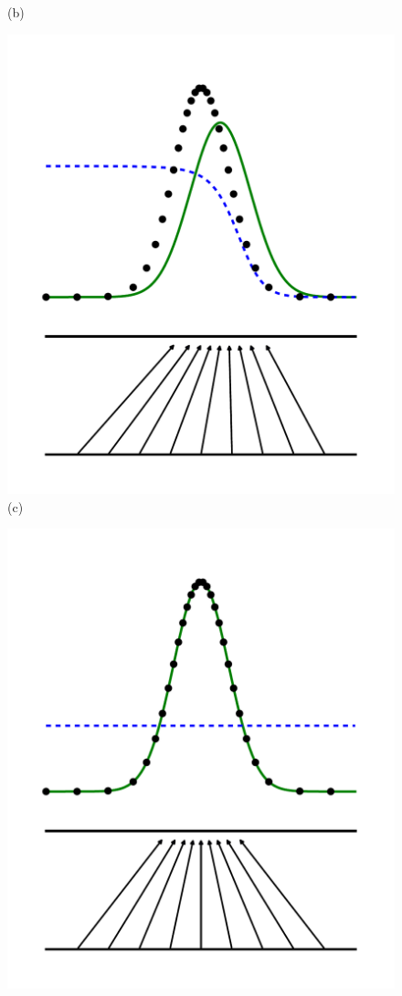 \begin{figure}[p]
\begin{minipage}[b]{0.5\linewidth}
    (b) 
    \vspace{4ex}
  \end{minipage} 
  \begin{minipage}[b]{0.5\linewidth}
    \centering
    \includegraphics[width=.9\linewidth]{figures/fig3.pdf}  \\
    (c) 
    \vspace{4ex}
  \end{minipage}%
  \begin{minipage}[b]{0.5\linewidth}
    \centering
    \includegraphics[width=.9\linewidth]{figures/fig4.pdf} \\

\end{minipage}
\end{figure}

